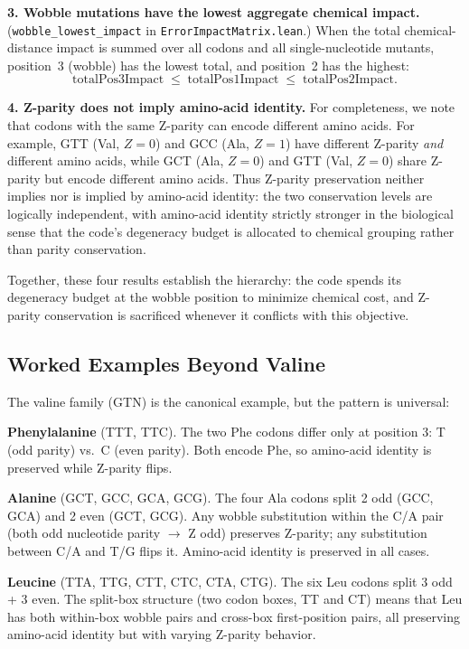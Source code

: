 \documentclass[11pt,twocolumn]{article}
\begin{document}
\textbf{3. Wobble mutations have the lowest aggregate chemical impact.}
(\texttt{wobble\_lowest\_impact} in \texttt{ErrorImpactMatrix.lean}.)
When the total chemical-distance impact is summed over all codons and all
single-nucleotide mutants, position~3 (wobble) has the lowest total, and
position~2 has the highest:
\[
  \text{totalPos3Impact} \;\leq\; \text{totalPos1Impact}
  \;\leq\; \text{totalPos2Impact}.
\]

\textbf{4. Z-parity does not imply amino-acid identity.}
For completeness, we note that codons with the same Z-parity can encode
different amino acids. For example, GTT (Val, $Z = 0$) and GCC (Ala,
$Z = 1$) have different Z-parity \emph{and} different amino acids, while
GCT (Ala, $Z = 0$) and GTT (Val, $Z = 0$) share Z-parity but encode
different amino acids. Thus Z-parity preservation neither implies nor is
implied by amino-acid identity: the two conservation levels are logically
independent, with amino-acid identity strictly stronger in the biological
sense that the code's degeneracy budget is allocated to chemical grouping
rather than parity conservation.

Together, these four results establish the hierarchy: the code spends its
degeneracy budget at the wobble position to minimize chemical cost, and
Z-parity conservation is sacrificed whenever it conflicts with this
objective.

\subsection{Worked Examples Beyond Valine}

The valine family (GTN) is the canonical example, but the pattern is
universal:

\textbf{Phenylalanine} (TTT, TTC). The two Phe codons differ only at
position 3: T (odd parity) vs.\ C (even parity). Both encode Phe, so
amino-acid identity is preserved while Z-parity flips.

\textbf{Alanine} (GCT, GCC, GCA, GCG). The four Ala codons split 2
odd (GCC, GCA) and 2 even (GCT, GCG). Any wobble substitution within the
C/A pair (both odd nucleotide parity $\to$ Z odd) preserves Z-parity; any
substitution between C/A and T/G flips it. Amino-acid identity is preserved
in all cases.

\textbf{Leucine} (TTA, TTG, CTT, CTC, CTA, CTG). The six Leu codons
split 3 odd + 3 even. The split-box structure (two codon boxes, TT and CT)
means that Leu has both within-box wobble pairs and cross-box first-position
pairs, all preserving amino-acid identity but with varying Z-parity
behavior.
\end{document}
